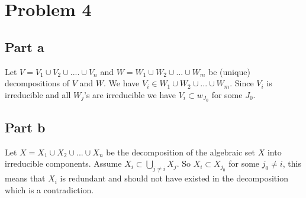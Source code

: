 \documentclass[12pt]{article}
\begin{document}
\section*{Problem 4}
\subsection*{Part a}
Let $V=V_1 \cup V_2 \cup .... \cup V_n$ and $W=W_1 \cup W_2 \cup ... \cup W_m$ be (unique) decompositions of $V$ and $W$. We have $V_i \in W_1 \cup W_2 \cup ... \cup W_m$. Since $V_i$ is irreducible and all $W_j$'s are irreducible we have $V_i \subset w_{J_0}$ for some $J_0$.
\subsection*{Part b}
Let $X= X_1 \cup X_2 \cup ... \cup X_n$ be the decomposition of the algebraic set $X$ into irreducible components. Assume $X_i \subset \bigcup_{j \not=i} X_j$.
So $X_i \subset X_{j_0}$ for some $j_0 \not= i$, this means that $X_i$ is redundant and should not have existed in the decomposition which is a contradiction.
\end{document}
